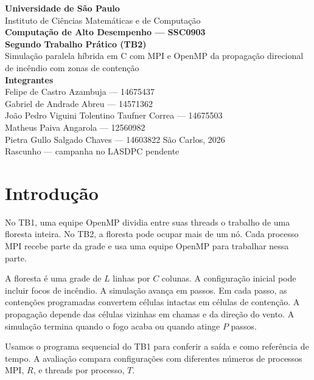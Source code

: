 \documentclass[12pt,a4paper]{article}
\begin{document}
\hypersetup{pageanchor=false}
\begin{titlepage}
    \centering
    {\large \textbf{Universidade de São Paulo}}\\[0.15cm]
    {\large Instituto de Ciências Matemáticas e de Computação}\\[0.8cm]
    {\large \textbf{Computação de Alto Desempenho --- SSC0903}}\\[4.6cm]
    {\Huge \textbf{Segundo Trabalho Prático (TB2)}}\\[0.4cm]
    {\Large Simulação paralela híbrida em C com MPI e OpenMP da propagação direcional de incêndio com zonas de contenção}\\[5.1cm]
    \textbf{Integrantes}\\[0.35cm]
    Felipe de Castro Azambuja --- 14675437\\
    Gabriel de Andrade Abreu --- 14571362\\
    João Pedro Viguini Tolentino Taufner Correa --- 14675503\\
    Matheus Paiva Angarola --- 12560982\\
    Pietra Gullo Salgado Chaves --- 14603822
    \vfill
    {\large São Carlos, 2026}\\[0.3cm]{\small Rascunho --- campanha no LASDPC pendente}
\end{titlepage}

\hypersetup{pageanchor=true}
{\small\tableofcontents}
\newpage
{}

\section{Introdução}

No TB1, uma equipe OpenMP dividia entre suas threads o trabalho de uma floresta inteira. No TB2, a floresta pode ocupar mais de um nó. Cada processo MPI recebe parte da grade e usa uma equipe OpenMP para trabalhar nessa parte.

A floresta é uma grade de $L$ linhas por $C$ colunas. A configuração inicial pode incluir focos de incêndio. A simulação avança em passos. Em cada passo, as contenções programadas convertem células intactas em células de contenção. A propagação depende das células vizinhas em chamas e da direção do vento. A simulação termina quando o fogo acaba ou quando atinge $P$ passos.

Usamos o programa sequencial do TB1 para conferir a saída e como referência de tempo. A avaliação compara configurações com diferentes números de processos MPI, $R$, e threads por processo, $T$.
\end{document}
